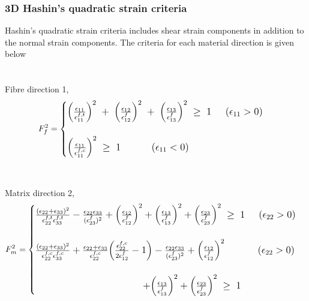 \documentclass[a4paper,14pt]{extarticle}
\begin{document}
\subsubsection{3D Hashin's quadratic strain criteria}
\indent\indent\indent Hashin's quadratic strain criteria includes shear strain components in addition to the normal strain components. The criteria for each material direction is given below\\
\\
\\
Fibre direction 1,
\\
\begin{equation}
\large{F_{f}^{2} =  
	\begin{cases}
	
		\Big(\frac{\epsilon_{11}}{\epsilon_{11}^{f,t}}\Big)^{2} \; + \; \Big(\frac{\epsilon_{12}}{\epsilon_{12}^{f}}\Big)^{2} \; + \; \Big(\frac{\epsilon_{13}}{\epsilon_{13}^{f}}\Big)^{2} \; \geq  \; 1  \; \; \; \; \;  (\epsilon_{11}  >  0)  \\
	\\
	\Big(\frac{\epsilon_{11}}{\epsilon_{11}^{f,c}}\Big)^{2}  \; \geq  \; 1 \; \; \; \; \; \; \;  \; \; \; \;  (\epsilon_{11}  <  0) 

	
	\end{cases}}
\end{equation}
\\
\\
Matrix direction 2,
\\
\begin{equation}
\large{F_{m}^{2} =  
	\begin{cases}
	
	\frac{(\epsilon_{22} + \epsilon_{33} )^{2}}{\epsilon_{22}^{f,t} \epsilon_{33}^{f,t}}   -  \frac{\epsilon_{22}\epsilon_{33}}{(\epsilon_{23}^{f})^{2}}  +  \Big(\frac{\epsilon_{12}}{\epsilon_{12}^{f}}\Big)^{2}  + \Big(\frac{\epsilon_{13}}{\epsilon_{13}^{f}}\Big)^{2}  +  \Big(\frac{\epsilon_{23}}{\epsilon_{23}^{f}}\Big)^{2} \;\geq  \; 1 \; \; \; \; \;  (\epsilon_{22}  >  0) \\
	\\
	
	\frac{(\epsilon_{22} + \epsilon_{33} )^{2}}{\epsilon_{22}^{f,c} \epsilon_{33}^{f,c}}  +  \frac{\epsilon_{22} + \epsilon_{33}}{\epsilon_{22}^{f,c}}\Big(\frac{\epsilon_{22}^{f,c}}{2\epsilon_{12}^{f}}  -  1\Big)   -  \frac{\epsilon_{22}\epsilon_{33}}{(\epsilon_{23}^{f})^{2}}  +  \Big(\frac{\epsilon_{12}}{\epsilon_{12}^{f}}\Big)^{2}\; \; \; \; \; \; \; \; \; \; \; \;  (\epsilon_{22}  >  0) \\ 
\\	
	\; \; \; \; \; \; \; \;\; \; \; \; \; \; \; \;\; \; \; \; \; \; \; \;  \; \;\; \; \; \; \; \; \; \;\; \; \; \; \;  + \Big(\frac{\epsilon_{13}}{\epsilon_{13}^{f}}\Big)^{2}   +  \Big(\frac{\epsilon_{23}}{\epsilon_{23}^{f}}\Big)^{2} \;\geq \; 1 
	
	
	\end{cases}}
\end{equation}
\end{document}
